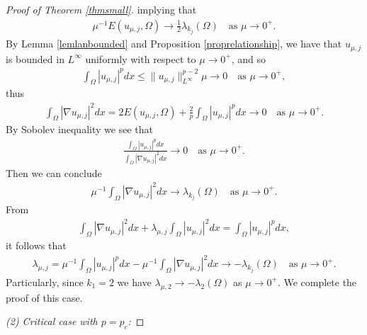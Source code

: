 \documentclass[10pt,a4paper]{amsart}
\newcommand{\la}{\lambda}
\begin{document}
\begin{proof}[Proof of Theorem \ref{thmsmall}]
implying that
\begin{align*}
	\mu^{-1}E(u_{\mu,j},\Omega) \to \frac12\la_{k_j}(\Omega) \quad \text{as } \mu \to 0^+.
\end{align*}
By Lemma \ref{lemlanbounded} and Proposition \ref{proprelationship}, we have that $u_{\mu,j}$ is bounded in $L^\infty$ uniformly with respect to $\mu \to 0^+$, and so
\begin{align*}
	\int_\Omega |u_{\mu,j}|^pdx \le \|u_{\mu,j}\|_{L^\infty}^{p-2}\mu \to 0 \quad \text{as } \mu \to 0^+,
\end{align*}
thus
\begin{align*}
	\int_\Omega |\nabla u_{\mu,j}|^2dx = 2E(u_{\mu,j},\Omega) + \frac2p\int_\Omega |u_{\mu,j}|^pdx \to 0 \quad \text{as } \mu \to 0^+.
\end{align*}
By Sobolev inequality we see that
\begin{align*}
	\frac{\int_\Omega |u_{\mu,j}|^pdx}{\int_\Omega |\nabla u_{\mu,j}|^2dx} \to 0 \quad \text{as } \mu \to 0^+.
\end{align*}
Then we can conclude
\begin{align*}
	\mu^{-1}\int_\Omega|\nabla u_{\mu,j}|^2dx \to \la_{k_j}(\Omega) \quad \text{as } \mu \to 0^+.
\end{align*}
From
\begin{align*}
	\int_\Omega |\nabla u_{\mu,j}|^2 dx + \la_{\mu,j} \int_\Omega |u_{\mu,j}|^2dx = \int_\Omega |u_{\mu,j}|^p dx,
\end{align*}
it follows that
\begin{align*}
	\la_{\mu,j} = \mu^{-1}\int_\Omega |u_{\mu,j}|^p dx - \mu^{-1}\int_\Omega |\nabla u_{\mu,j}|^2 dx \to - \la_{k_j}(\Omega) \quad \text{as } \mu \to 0^+.
\end{align*}
Particularly, since $k_1 = 2$ we have $\la_{\mu,2} \to -\la_2(\Omega)$ as $\mu \to 0^+$. We complete the proof of this case.

\vskip0.1in
\emph{(2) Critical case with $p = p_c$: }


\end{proof}
\end{document}
